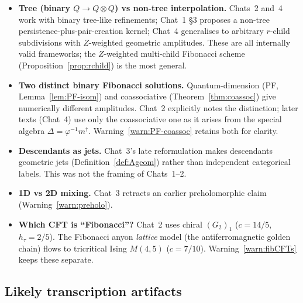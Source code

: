 \documentclass[11pt,a4paper]{article}
\theoremstyle{definition}
\newcommand{\one}{\mathbf{1}}
\begin{document}
\begin{itemize}[leftmargin=*]
      $\tau\tau$ pairs'', though that phrasing is categorically loose since
      $\one$ itself is the simple unit). \emph{Resolution adopted:} use the
      splitting-compatible reading
      whenever splitting is needed; the empty-site reading is consistent
      only for the length-weighted square-zero/number-preserving model
      (\S\ref{sec:square-zero}).
\item \textbf{Tree (binary $Q\to Q\otimes Q$) vs non-tree interpolation.}
      Chats~2 and~4 work with binary tree-like refinements; Chat~1 §3
      proposes a non-tree persistence-plus-pair-creation kernel; Chat~4
      generalises to arbitrary $r$-child subdivisions with $Z$-weighted
      geometric amplitudes. These are all internally valid frameworks; the
      $Z$-weighted multi-child Fibonacci scheme (Proposition~\ref{prop:rchild})
      is the most general.
\item \textbf{Two distinct binary Fibonacci solutions.} Quantum-dimension
      (PF, Lemma~\ref{lem:PF-isom}) and coassociative (Theorem~\ref{thm:coassoc})
      give numerically different amplitudes. Chat~2 explicitly notes the
      distinction; later texts (Chat~4) use only the coassociative one as
      it arises from the special algebra $\Delta = \varphi^{-1}m^\dagger$.
      Warning~\ref{warn:PF-coassoc} retains both for clarity.
\item \textbf{Descendants as jets.} Chat~3's late reformulation makes
      descendants geometric jets (Definition~\ref{def:Ageom}) rather than
      independent categorical labels. This was not the framing of Chats~1--2.
\item \textbf{1D vs 2D mixing.} Chat~3 retracts an earlier preholomorphic
      claim (Warning~\ref{warn:preholo}).
\item \textbf{Which CFT is ``Fibonacci''?} Chat~2 uses chiral $(G_2)_1$
      ($c=14/5$, $h_\tau=2/5$). The Fibonacci anyon \emph{lattice} model
      (the antiferromagnetic golden chain) flows to tricritical Ising
      $M(4,5)$ ($c=7/10$). Warning~\ref{warn:fibCFTs} keeps these separate.
\end{itemize}

\subsection{Likely transcription artifacts}
\end{document}
